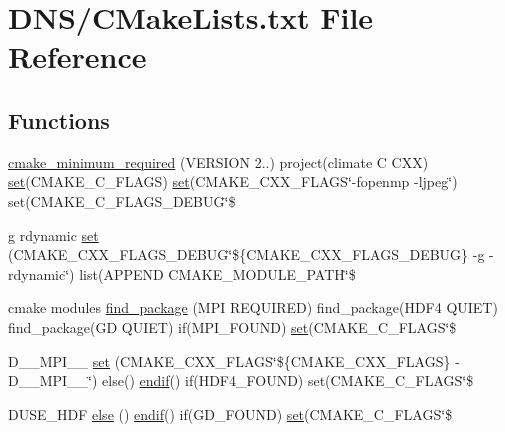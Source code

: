 \hypertarget{_c_make_lists_8txt}{}\section{D\+N\+S/\+C\+Make\+Lists.txt File Reference}
\label{_c_make_lists_8txt}
\subsection*{Functions}
\begin{DoxyCompactItemize}
\item 
\hyperlink{_c_make_lists_8txt_a741efbab0d1bbcaad7a9d6bf134bb569}{cmake\+\_\+minimum\+\_\+required} (V\+E\+R\+S\+I\+ON 2..) project(climate C C\+XX) \hyperlink{src_2_c_make_lists_8txt_a1f7c8e71ec60358e07581ba9cdd732b2}{set}(C\+M\+A\+K\+E\+\_\+\+C\+\_\+\+F\+L\+A\+GS) \hyperlink{src_2_c_make_lists_8txt_a1f7c8e71ec60358e07581ba9cdd732b2}{set}(C\+M\+A\+K\+E\+\_\+\+C\+X\+X\+\_\+\+F\+L\+A\+GS\char`\"{}-\/fopenmp -\/ljpeg\char`\"{}) set(C\+M\+A\+K\+E\+\_\+\+C\+\_\+\+F\+L\+A\+G\+S\+\_\+\+D\+E\+B\+UG\char`\"{}\$
\item 
g rdynamic \hyperlink{_c_make_lists_8txt_a7b42a891a494c11028470b44e72f37f8}{set} (C\+M\+A\+K\+E\+\_\+\+C\+X\+X\+\_\+\+F\+L\+A\+G\+S\+\_\+\+D\+E\+B\+UG\char`\"{}\$\{C\+M\+A\+K\+E\+\_\+\+C\+X\+X\+\_\+\+F\+L\+A\+G\+S\+\_\+\+D\+E\+B\+UG\} -\/g -\/rdynamic\char`\"{}) list(A\+P\+P\+E\+ND C\+M\+A\+K\+E\+\_\+\+M\+O\+D\+U\+L\+E\+\_\+\+P\+A\+TH\char`\"{}\$
\item 
cmake modules \hyperlink{_c_make_lists_8txt_a23bf2667b4b205c88b8841f172fb7f3d}{find\+\_\+package} (M\+PI R\+E\+Q\+U\+I\+R\+ED) find\+\_\+package(H\+D\+F4 Q\+U\+I\+ET) find\+\_\+package(GD Q\+U\+I\+ET) if(M\+P\+I\+\_\+\+F\+O\+U\+ND) \hyperlink{src_2_c_make_lists_8txt_a1f7c8e71ec60358e07581ba9cdd732b2}{set}(C\+M\+A\+K\+E\+\_\+\+C\+\_\+\+F\+L\+A\+GS\char`\"{}\$
\item 
D\+\_\+\+\_\+\+M\+P\+I\+\_\+\+\_\+ \hyperlink{_c_make_lists_8txt_a9d86627124494b13a13b1c7d05f60c5a}{set} (C\+M\+A\+K\+E\+\_\+\+C\+X\+X\+\_\+\+F\+L\+A\+GS\char`\"{}\$\{C\+M\+A\+K\+E\+\_\+\+C\+X\+X\+\_\+\+F\+L\+A\+GS\} -\/D\+\_\+\+\_\+\+M\+P\+I\+\_\+\+\_\+\char`\"{}) else() \hyperlink{src_2_c_make_lists_8txt_aef342c7d9b2e3710bae20e89a22eca4e}{endif}() if(H\+D\+F4\+\_\+\+F\+O\+U\+ND) set(C\+M\+A\+K\+E\+\_\+\+C\+\_\+\+F\+L\+A\+GS\char`\"{}\$
\item 
D\+U\+S\+E\+\_\+\+H\+DF \hyperlink{_c_make_lists_8txt_af58b0362e4628678c6d0dde90f777c6c}{else} () \hyperlink{src_2_c_make_lists_8txt_aef342c7d9b2e3710bae20e89a22eca4e}{endif}() if(G\+D\+\_\+\+F\+O\+U\+ND) \hyperlink{src_2_c_make_lists_8txt_a1f7c8e71ec60358e07581ba9cdd732b2}{set}(C\+M\+A\+K\+E\+\_\+\+C\+\_\+\+F\+L\+A\+GS\char`\"{}\$
\end{DoxyCompactItemize}


